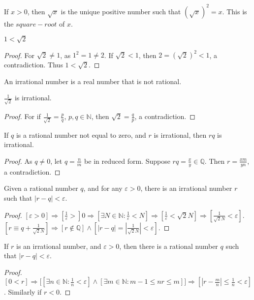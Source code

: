 \documentclass[crop=false,class=book]{standalone}
\begin{document}
\begin{definition}
If $x>0$, then $\sqrt{x}$ is the unique positive number such that $(\sqrt{x})^2 = x$. This is the $square-root$ of $x$.
\end{definition}
\begin{corollary}
$1<\sqrt{2}$
\end{corollary}
\begin{proof}
For $\sqrt{2} \ne 1$, as $1^2 = 1\ne 2$. If $\sqrt{2}<1$, then $2=(\sqrt{2})^2 <1$, a contradiction. Thus $1<\sqrt{2}$.
\end{proof}
\begin{definition}
An irrational number is a real number that is not rational.
\end{definition}
\begin{corollary}
$\frac{1}{\sqrt{2}}$ is irrational. 
\end{corollary}
\begin{proof}
For if $\frac{1}{\sqrt{2}} = \frac{p}{q}$, $p,q\in \mathbb{N}$, then $\sqrt{2} = \frac{q}{p}$, a contradiction.
\end{proof}
\begin{lemma}
If $q$ is a rational number not equal to zero, and $r$ is irrational, then $rq$ is irrational.
\end{lemma}
\begin{proof}
As $q\ne 0$, let $q = \frac{n}{m}$ be in reduced form. Suppose $rq = \frac{x}{y}\in \mathbb{Q}$. Then $r=\frac{xm}{yn}$, a contradiction.
\end{proof}
\begin{theorem}
Given a rational number $q$, and for any $\varepsilon>0$, there is an irrational number $r$ such that $|r-q|<\varepsilon$.
\end{theorem}
\begin{proof}
$[\varepsilon>0]\Rightarrow [\frac{1}{\varepsilon}>]0\Rightarrow [\exists N\in \mathbb{N}:\frac{1}{\varepsilon}<N]\Rightarrow [\frac{1}{\varepsilon} < \sqrt{2}N]\Rightarrow [\frac{1}{\sqrt{2}N}< \varepsilon]$. $[r \equiv q+\frac{1}{\sqrt{2}{N}}]\Rightarrow [r\notin \mathbb{Q}]\land [|r-q| = |\frac{1}{\sqrt{2}N}| < \varepsilon]$.
\end{proof}
\begin{theorem}
If $r$ is an irrational number, and $\varepsilon>0$, then there is a rational number $q$ such that $|r-q|<\varepsilon$.
\end{theorem}
\begin{proof}
$[0<r]\Rightarrow \big[[\exists n\in \mathbb{N}: \frac{1}{n} < \varepsilon]\land[\exists m\in \mathbb{N}: m-1\leq nr \leq m]\big]\Rightarrow[|r-\frac{m}{n}| \leq \frac{1}{n} < \varepsilon]$. Similarly if $r<0$.
\end{proof}
\end{document}
